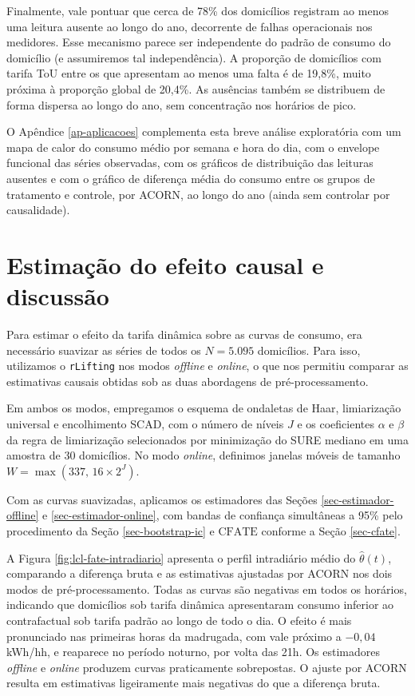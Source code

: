 Finalmente, vale pontuar que cerca de 78\% dos domicílios registram ao menos uma leitura ausente ao longo do ano, decorrente de falhas operacionais nos medidores. Esse mecanismo parece ser independente do padrão de consumo do domicílio (e assumiremos tal independência). A proporção de domicílios com tarifa ToU entre os que apresentam ao menos uma falta é de 19,8\%, muito próxima à proporção global de 20,4\%. 
As ausências também se distribuem de forma dispersa ao longo do ano, sem concentração nos horários de pico.

O Apêndice \ref{ap-aplicacoes} complementa esta breve análise exploratória com um mapa de calor do consumo médio por semana e hora do dia, com o envelope funcional das séries observadas, com os gráficos de distribuição das leituras ausentes e com o gráfico de diferença média do consumo entre os grupos de tratamento e controle, por ACORN, ao longo do ano (ainda sem controlar por causalidade).

\section{Estimação do efeito causal e discussão}\label{sec-aplicacoes-resultados}

Para estimar o efeito da tarifa dinâmica sobre as curvas de consumo, era necessário suavizar as séries de todos os \(N = 5.095\) domicílios. 
Para isso, utilizamos o \texttt{rLifting} nos modos \emph{offline} e \emph{online}, o que nos permitiu comparar as estimativas causais obtidas sob as duas abordagens de pré-processamento.

Em ambos os modos, empregamos o esquema de ondaletas de Haar, limiarização universal e encolhimento SCAD, com o número de níveis \(J\) e os coeficientes \(\alpha\) e \(\beta\) da regra de limiarização selecionados por minimização do SURE mediano em uma amostra de 30 domicílios. 
No modo \emph{online}, definimos janelas móveis de tamanho \(W = \max(337,\, 16 \times 2^{J})\).

Com as curvas suavizadas, aplicamos os estimadores das Seções \ref{sec-estimador-offline} e \ref{sec-estimador-online}, com bandas de confiança simultâneas a 95\% pelo procedimento da Seção \ref{sec-bootstrap-ic} e \(\mathrm{CFATE}\) conforme a Seção \ref{sec-cfate}.

A Figura \ref{fig:lcl-fate-intradiario} apresenta o perfil intradiário médio do \(\hat{\theta}(t)\), comparando a diferença bruta e as estimativas ajustadas por ACORN nos dois modos de pré-processamento. 
Todas as curvas são negativas em todos os horários, indicando que domicílios sob tarifa dinâmica apresentaram consumo inferior ao contrafactual sob tarifa padrão ao longo de todo o dia. 
O efeito é mais pronunciado nas primeiras horas da madrugada, com vale próximo a \(-0{,}04\) kWh/hh, e reaparece no período noturno, por volta das 21h. 
Os estimadores \emph{offline} e \emph{online} produzem curvas praticamente sobrepostas. 
O ajuste por ACORN resulta em estimativas ligeiramente mais negativas do que a diferença bruta. 

